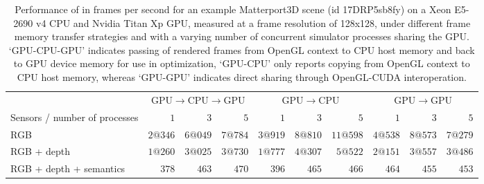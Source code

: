 \begin{table}
  \centering
  \begin{tabular}{@{}lrrrrrrrrr@{}}
      \toprule
      & \multicolumn{3}{c}{GPU$\rightarrow$CPU$\rightarrow$GPU} & \multicolumn{3}{c}{GPU$\rightarrow$CPU} & \multicolumn{3}{c}{GPU$\rightarrow$GPU}\\
      \cmidrule(l){2-4} \cmidrule(l){5-7} \cmidrule(l){8-10}
      Sensors / number of processes & $1$ & $3$ & $5$ & $1$ & $3$ & $5$ & $1$ & $3$ & $5$ \\
      \midrule
      RGB & $2@346$ & $6@049$ & $7@784$ & $3@919$ & $8@810$ & $11@598$ & $4@538$ & $8@573$ & $7@279$\\
      RGB + depth & $1@260$ & $3@025$ & $3@730$ & $1@777$ & $4@307$ & $5@522$ & $2@151$ & $3@557$ & $3@486$\\
      RGB + depth + semantics\footnotemark{} 
      & $378$ & $463$ & $470$ & $396$ & $465$ & $466$ & $464$ & $455$ & $453$\\
      \bottomrule
  \end{tabular}
  \vspace{1mm}
  \caption{Performance of \habitatsim in frames per second for an example Matterport3D scene (id 17DRP5sb8fy) on a Xeon E5-2690 v4 CPU and Nvidia Titan Xp GPU, measured at a frame resolution of 128x128, under different frame memory transfer strategies and with a varying number of concurrent simulator processes sharing the GPU.
  `GPU-CPU-GPU' indicates passing of rendered frames from OpenGL context to CPU host memory and back to GPU device memory for use in optimization, `GPU-CPU' only reports copying from OpenGL context to CPU host memory, whereas `GPU-GPU' indicates direct sharing through OpenGL-CUDA interoperation.}
  \label{tab:performance}
\end{table}

